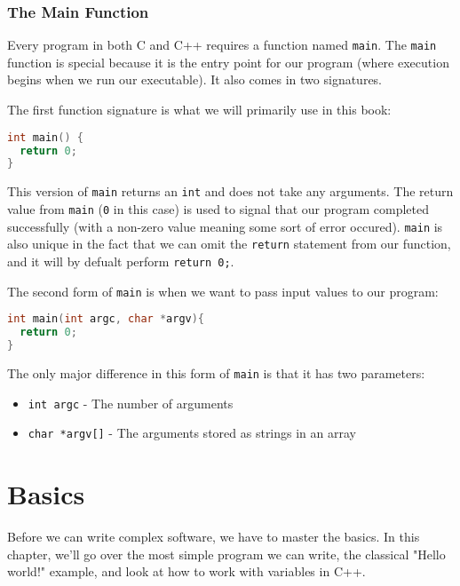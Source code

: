 \documentclass[11pt,fancy,authoryear]{elegantbook}
\begin{document}
\subsection{The Main Function}

Every program in both C and C++ requires a function named \lstinline{main}. The \lstinline{main} function is special because it is the entry point for our program (where execution begins when we run our executable). It also comes in two signatures.

The first function signature is what we will primarily use in this book:

\begin{lstlisting}[language=C++]
int main() {
  return 0;
}
\end{lstlisting}

This version of \lstinline{main} returns an \lstinline{int} and does not take any arguments. The return value from \lstinline{main} (\lstinline{0} in this case) is used to signal that our program completed successfully (with a non-zero value meaning some sort of error occured). \lstinline{main} is also unique in the fact that we can omit the \lstinline{return} statement from our function, and it will by defualt perform \lstinline{return 0;}.

The second form of \lstinline{main} is when we want to pass input values to our program:

\begin{lstlisting}[language=C++]
int main(int argc, char *argv){
  return 0;
}
\end{lstlisting}

The only major difference in this form of \lstinline{main} is that it has two parameters:

\begin{itemize}
  \item \lstinline{int argc} - The number of arguments
  \item \lstinline{char *argv[]} - The arguments stored as strings in an array
\end{itemize}

\chapter{Basics}

Before we can write complex software, we have to master the basics. In this chapter, we'll go over the most simple program we can write, the classical "Hello world!" example, and look at how to work with variables in C++.
\end{document}
